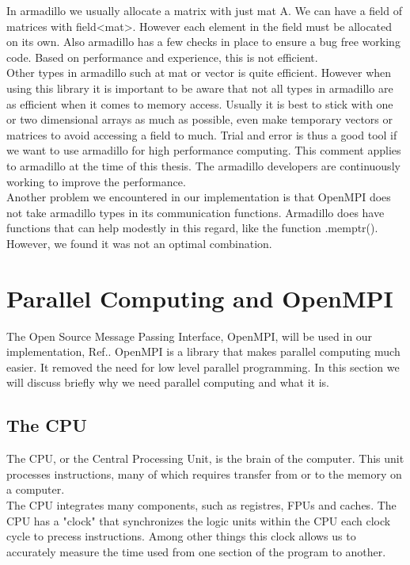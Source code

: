 \documentclass[a4paper,norsk,11pt,twoside]{report}
\begin{document}
In armadillo we usually allocate a matrix with just mat A. We can have a field of matrices with field<mat>. However each element in the field must be allocated on its own. Also armadillo has a few checks in place to ensure a bug free working code. Based on performance and experience, this is not efficient. \\

Other types in armadillo such at mat or vector is quite efficient. However when using this library it is important to be aware that not all types in armadillo are as efficient when it comes to memory access. Usually it is best to stick with one or two dimensional arrays as much as possible, even make temporary vectors or matrices to avoid accessing a field to much. Trial and error is thus a good tool if we want to use armadillo for high performance computing. This comment applies to armadillo at the time of this thesis. The armadillo developers are continuously working to improve the performance. \\

Another problem we encountered in our implementation is that OpenMPI does not take armadillo types in its communication functions. Armadillo does have functions that can help modestly in this regard, like the function .memptr(). However, we found it was not an optimal combination.

\section{Parallel Computing and OpenMPI}
The Open Source Message Passing Interface, OpenMPI, will be used in our implementation, Ref.\cite{openmpi_cite}. OpenMPI is a library that makes parallel computing much easier. It removed the need for low level parallel programming. In this section we will discuss briefly why we need parallel computing and what it is.

\subsection{The CPU \label{the_cpu_section}}
The CPU, or the Central Processing Unit, is the brain of the computer. This unit processes instructions, many of which requires transfer from or to the memory on a computer. \\

The CPU integrates many components, such as registres, FPUs and caches. The CPU has a "clock" that synchronizes the logic units within the CPU each clock cycle to precess instructions. Among other things this clock allows us to accurately measure the time used from one section of the program to another. \\
\end{document}
